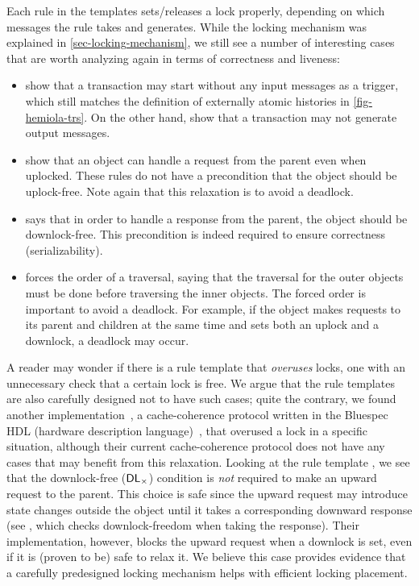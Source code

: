 \documentclass[sigplan,10pt,review,anonymous,screen]{acmart}\settopmatter{printfolios=true,printccs=false,printacmref=false}
\begin{document}
Each rule in the templates sets/releases a lock properly, depending on which messages the rule takes and generates.
While the locking mechanism was explained in \autoref{sec-locking-mechanism}, we still see a number of interesting cases that are worth analyzing again in terms of correctness and liveness:
\begin{itemize}
\item {} show that a transaction may start without any input messages as a trigger, which still matches the definition of externally atomic histories in \autoref{fig-hemiola-trs}. On the other hand,  show that a transaction may not generate output messages.
\item {} show that an object can handle a request from the parent even when uplocked. These rules do not have a precondition that the object should be uplock-free. Note again that this relaxation is to avoid a deadlock.
\item {} says that in order to handle a response from the parent, the object should be downlock-free. This precondition is indeed required to ensure correctness (serializability).
\item {} forces the order of a traversal, saying that the traversal for the outer objects must be done before traversing the inner objects. The forced order is important to avoid a deadlock. For example, if the object makes requests to its parent and children at the same time and sets both an uplock and a downlock, a deadlock may occur.
\end{itemize}

A reader may wonder if there is a rule template that \emph{overuses} locks, \ie{} one with an unnecessary check that a certain lock is free.
We argue that the rule templates are also carefully designed not to have such cases; quite the contrary, we found another implementation~\cite{Zhang:2019,thesis:Zhang:2019}, a cache-coherence protocol written in the Bluespec HDL (hardware description language)~\cite{bluespec}, that overused a lock in a specific situation, although their current cache-coherence protocol does not have any cases that may benefit from this relaxation.
Looking at the rule template , we see that the downlock-free ($\textsf{DL}_{\times}$) condition is \emph{not} required to make an upward request to the parent.
This choice is safe since the upward request may introduce state changes outside the object until it takes a corresponding downward response (see , which checks downlock-freedom when taking the response).
Their implementation, however, blocks the upward request when a downlock is set, even if it is (proven to be) safe to relax it.
We believe this case provides evidence that a carefully predesigned locking mechanism helps with efficient locking placement.
\end{document}

